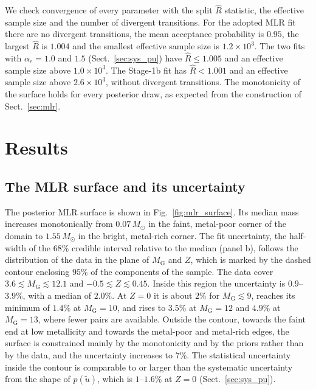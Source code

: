 \documentclass{aa}
\newcommand{\msun}{M_{\odot}}
\begin{document}
We check convergence of every parameter with the split $\hat R$ statistic, the effective sample size and the number of divergent transitions. For the adopted MLR fit there are no divergent transitions, the mean acceptance probability is $0.95$, the largest $\hat R$ is $1.004$ and the smallest effective sample size is $1.2\times10^{3}$. The two fits with $\alpha_e=1.0$ and $1.5$ (Sect.~\ref{sec:sys_pu}) have $\hat R\le1.005$ and an effective sample size above $1.0\times10^3$. The Stage-1b fit has $\hat R<1.001$ and an effective sample size above $2.6\times10^3$, without divergent transitions. The monotonicity of the surface holds for every posterior draw, as expected from the construction of Sect.~\ref{sec:mlr}.

\section{Results}\label{sec:results}

\subsection{The MLR surface and its uncertainty}
The posterior MLR surface is shown in Fig.~\ref{fig:mlr_surface}. Its median mass increases monotonically from $0.07\,\msun$ in the faint, metal-poor corner of the domain to $1.55\,\msun$ in the bright, metal-rich corner. The fit uncertainty, the half-width of the $68\%$ credible interval relative to the median (panel b), follows the distribution of the data in the plane of $M_{\mathrm{G}}$ and $Z$, which is marked by the dashed contour enclosing $95\%$ of the components of the sample. The data cover $3.6\lesssim M_{\mathrm{G}}\lesssim12.1$ and $-0.5\lesssim Z\lesssim0.45$. Inside this region the uncertainty is $0.9$--$3.9\%$, with a median of $2.0\%$. At $Z=0$ it is about $2\%$ for $M_{\mathrm{G}}\lesssim9$, reaches its minimum of $1.4\%$ at $M_{\mathrm{G}}=10$, and rises to $3.5\%$ at $M_{\mathrm{G}}=12$ and $4.9\%$ at $M_{\mathrm{G}}=13$, where fewer pairs are available. Outside the contour, towards the faint end at low metallicity and towards the metal-poor and metal-rich edges, the surface is constrained mainly by the monotonicity and by the priors rather than by the data, and the uncertainty increases to $7\%$. The statistical uncertainty inside the contour is comparable to or larger than the systematic uncertainty from the shape of $p(\widetilde u)$, which is $1$--$1.6\%$ at $Z=0$ (Sect.~\ref{sec:sys_pu}).
\end{document}
